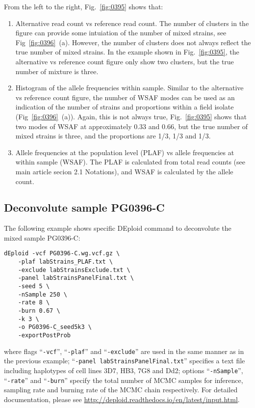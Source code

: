 From the left to the right, Fig.~\ref{fig:0395} shows that:
\begin{enumerate}
\item Alternative read count vs reference read count. The number of clusters in the figure can provide some intuiation of the number of mixed strains, see Fig~\ref{fig:0396}~(a). However, the number of clusters does not always reflect the true number of mixed strains. In the example shown in Fig.~\ref{fig:0395}, the alternative vs reference count figure only show two clusters, but the true number of mixture is three.

\item Histogram of the allele frequencies within sample. Similar to the alternative vs reference count figure, the number of WSAF modes can be used as an indication of the number of strains and proportions within a field isolate (Fig~\ref{fig:0396}~(a)). Again, this is not always true, Fig.~\ref{fig:0395} shows that two modes of WSAF at approximately 0.33 and 0.66, but the true number of mixed strains is three, and the proportions are 1/3, 1/3 and 1/3.

\item Allele frequencies at the population level (PLAF) vs allele frequencies at within sample (WSAF). The PLAF is calculated from total read counts (see main article secion 2.1 Notations), and WSAF is calculated by the allele count.
\end{enumerate}

\subsection{Deconvolute sample {\textmd PG0396-C}}
The following example shows specific {\textmd DEploid} command to deconvolute the mixed sample {\textmd PG0396-C}:
\linespread{1}
\begin{lstlisting}
dEploid -vcf PG0396-C.wg.vcf.gz \
    -plaf labStrains_PLAF.txt \
    -exclude labStrainsExclude.txt \
    -panel labStrainsPanelFinal.txt \
    -seed 5 \
    -nSample 250 \
    -rate 8 \
    -burn 0.67 \
    -k 3 \
    -o PG0396-C_seed5k3 \
    -exportPostProb
\end{lstlisting}
\linespread{1.5}
where flags ``{\tt -vcf}'', ``{\tt -plaf}'' and ``{\tt -exclude}'' are used in the same manner as in the previous example; ``{\tt -panel labStrainsPanelFinal.txt}'' specifies a text file including haplotypes of cell lines 3D7, HB3, 7G8 and Dd2; options ``{\tt -nSample}'', ``{\tt -rate}'' and ``{\tt -burn}'' specify the total number of MCMC samples for inference, sampling rate and burning rate of the MCMC chain respectively. For detailed documentation, please see \url{http://deploid.readthedocs.io/en/latest/input.html}.

